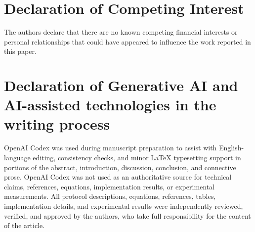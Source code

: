 \documentclass{ieeeijc}
\theoremstyle{remark}
\begin{document}
\section*{Declaration of Competing Interest}

The authors declare that there are no known competing financial
interests or personal relationships that could have appeared to
influence the work reported in this paper.

\section*{Declaration of Generative AI and AI-assisted technologies in the writing process}

OpenAI Codex was used during manuscript preparation to assist with
English-language editing, consistency checks, and minor LaTeX
typesetting support in portions of the abstract, introduction,
discussion, conclusion, and connective prose. OpenAI Codex was not used
as an authoritative source for technical claims, references, equations,
implementation results, or experimental measurements. All protocol
descriptions, equations, references, tables, implementation details, and
experimental results were independently reviewed, verified, and approved
by the authors, who take full responsibility for the content of the
article.
\end{document}
